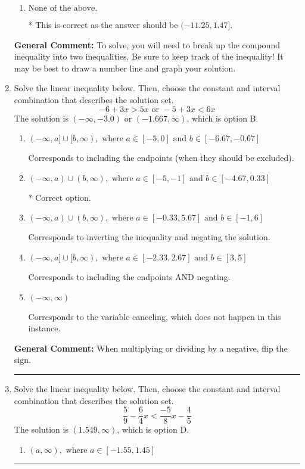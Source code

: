 \documentclass{extbook}[14pt]
\newcommand{\litem}[1]{\item #1

\rule{\textwidth}{0.4pt}}
\begin{document}
\begin{enumerate}
{\begin{enumerate}[label=\Alph*.]
$(-\infty, 11.25) \cup [-1.47, \infty)$, which corresponds to displaying the and-inequality as an or-inequality and getting negatives of the actual endpoints.
\item \( \text{None of the above.} \)

* This is correct as the answer should be $(-11.25, 1.47]$.
\end{enumerate}

\textbf{General Comment:} To solve, you will need to break up the compound inequality into two inequalities. Be sure to keep track of the inequality! It may be best to draw a number line and graph your solution.
}
\litem{
Solve the linear inequality below. Then, choose the constant and interval combination that describes the solution set.
\[ -6 + 3 x > 5 x \text{ or } -5 + 3 x < 6 x \]The solution is \( (-\infty, -3.0) \text{ or } (-1.667, \infty) \), which is option B.\begin{enumerate}[label=\Alph*.]
\item \( (-\infty, a] \cup [b, \infty), \text{ where } a \in [-5, 0] \text{ and } b \in [-6.67, -0.67] \)

Corresponds to including the endpoints (when they should be excluded).
\item \( (-\infty, a) \cup (b, \infty), \text{ where } a \in [-5, -1] \text{ and } b \in [-4.67, 0.33] \)

 * Correct option.
\item \( (-\infty, a) \cup (b, \infty), \text{ where } a \in [-0.33, 5.67] \text{ and } b \in [-1, 6] \)

Corresponds to inverting the inequality and negating the solution.
\item \( (-\infty, a] \cup [b, \infty), \text{ where } a \in [-2.33, 2.67] \text{ and } b \in [3, 5] \)

Corresponds to including the endpoints AND negating.
\item \( (-\infty, \infty) \)

Corresponds to the variable canceling, which does not happen in this instance.
\end{enumerate}

\textbf{General Comment:} When multiplying or dividing by a negative, flip the sign.
}
\litem{
Solve the linear inequality below. Then, choose the constant and interval combination that describes the solution set.
\[ \frac{5}{9} - \frac{6}{4} x < \frac{-5}{8} x - \frac{4}{5} \]The solution is \( (1.549, \infty) \), which is option D.\begin{enumerate}[label=\Alph*.]
\item \( (a, \infty), \text{ where } a \in [-1.55, 1.45] \)


\end{enumerate}}
\end{enumerate}
\end{document}
